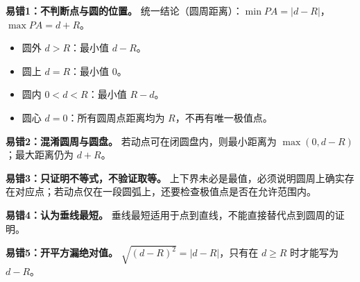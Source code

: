 \begin{trapbox}
\textbf{易错1：不判断点与圆的位置。}
统一结论（圆周距离）：$\min PA=|d-R|$，$\max PA=d+R$。
\begin{itemize}
\item 圆外 $d>R$：最小值 $d-R$。
\item 圆上 $d=R$：最小值 $0$。
\item 圆内 $0<d<R$：最小值 $R-d$。
\item 圆心 $d=0$：所有圆周点距离均为 $R$，不再有唯一极值点。
\end{itemize}\begin{center}

\end{center}
\textbf{易错2：混淆圆周与圆盘。} 若动点可在闭圆盘内，则最小距离为 $\max(0,d-R)$；最大距离仍为 $d+R$。

\textbf{易错3：只证明不等式，不验证取等。} 上下界未必是最值，必须说明圆周上确实存在对应点；若动点仅在一段圆弧上，还要检查极值点是否在允许范围内。

\textbf{易错4：认为垂线最短。} 垂线最短适用于点到直线，不能直接替代点到圆周的证明。

\textbf{易错5：开平方漏绝对值。} $\sqrt{(d-R)^2}=|d-R|$，只有在 $d\geqslant R$ 时才能写为 $d-R$。
\end{trapbox}
